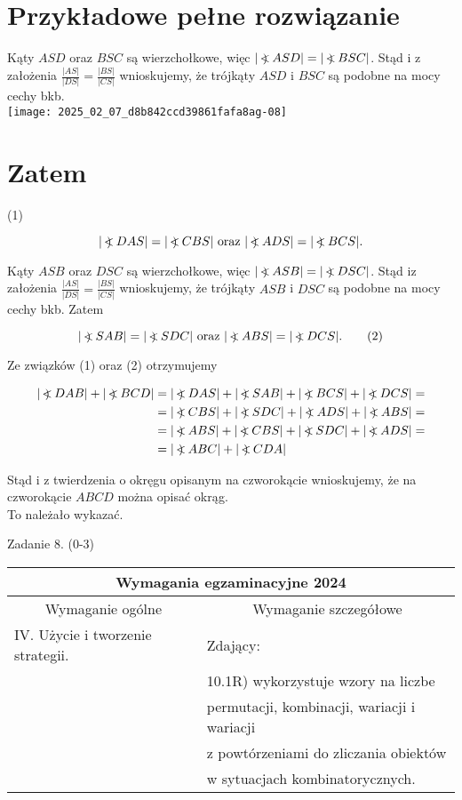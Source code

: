 \documentclass[10pt]{article}
\newcommand\Varangle{\mathop{{<\!\!\!\!\!\text{\small)}}\:}\nolimits}
\begin{document}
\section*{Przykładowe pełne rozwiązanie}
Kąty $A S D$ oraz $B S C$ są wierzchołkowe, więc $|\Varangle A S D|=|\Varangle B S C|$. Stąd i z założenia $\frac{|A S|}{|D S|}=\frac{|B S|}{|C S|}$ wnioskujemy, że trójkąty $A S D$ i $B S C$ są podobne na mocy cechy bkb.\\
\texttt{[image: 2025\_02\_07\_d8b842ccd39861fafa8ag-08]}

\section*{Zatem}
(1)

$$
|\Varangle D A S|=|\Varangle C B S| \text { oraz }|\Varangle A D S|=|\Varangle B C S| .
$$

Kąty $A S B$ oraz $D S C$ są wierzchołkowe, więc $|\Varangle A S B|=|\Varangle D S C|$. Stąd iz założenia $\frac{|A S|}{|D S|}=\frac{|B S|}{|C S|}$ wnioskujemy, że trójkąty $A S B$ i $D S C$ są podobne na mocy cechy bkb. Zatem


\begin{equation*}
|\Varangle S A B|=|\Varangle S D C| \text { oraz }|\Varangle A B S|=|\Varangle D C S| . \tag{2}
\end{equation*}


Ze związków (1) oraz (2) otrzymujemy

$$
\begin{aligned}
|\Varangle D A B|+|\Varangle B C D| & =|\Varangle D A S|+|\Varangle S A B|+|\Varangle B C S|+|\Varangle D C S|= \\
& =|\Varangle C B S|+|\Varangle S D C|+|\Varangle A D S|+|\Varangle A B S|= \\
& =|\Varangle A B S|+|\Varangle C B S|+|\Varangle S D C|+|\Varangle A D S|= \\
& =|\Varangle A B C|+|\Varangle C D A|
\end{aligned}
$$

Stąd i z twierdzenia o okręgu opisanym na czworokącie wnioskujemy, że na czworokącie $A B C D$ można opisać okrąg.\\
To należało wykazać.

Zadanie 8. (0-3)

\begin{center}
\begin{tabular}{|l|l|}
\hline
\multicolumn{2}{|c|}{Wymagania egzaminacyjne 2024} \\
\hline
\multicolumn{1}{|c|}{Wymaganie ogólne} & \multicolumn{1}{|c|}{Wymaganie szczegółowe} \\
\hline
IV. Użycie i tworzenie strategii. & Zdający: \\
 & 10.1R) wykorzystuje wzory na liczbe \\
 & permutacji, kombinacji, wariacji i wariacji \\
 & z powtórzeniami do zliczania obiektów \\
 & w sytuacjach kombinatorycznych. \\
\hline
\end{tabular}
\end{center}
\end{document}
